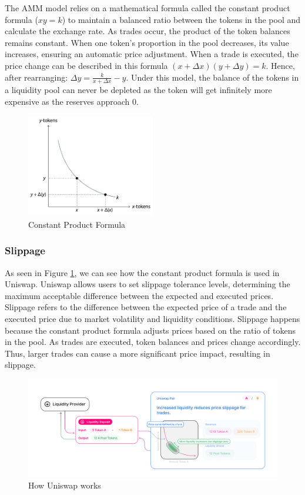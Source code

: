The AMM model relies on a mathematical formula called the constant product formula ($xy = k$) to maintain a balanced ratio between the tokens in the pool and calculate the exchange rate. As trades occur, the product of the token balances remains constant. When one token's proportion in the pool decreases, its value increases, ensuring an automatic price adjustment. When a trade is executed, the price change can be described in this formula $(x + \Delta x)(y + \Delta y) = k$. Hence, after rearranging: $\Delta y = \frac{k}{x + \Delta x} - y$. Under this model, the balance of the tokens in a liquidity pool can never be depleted as the token will get infinitely more expensive as the reserves approach 0.

\begin{figure}[!htb]
    \centering
    \includegraphics[width=0.5\textwidth]{background/Images/constant_product_formula.png}
    \caption{Constant Product Formula~\cite{schar2021decentralized}}
\end{figure}

\subsubsection{Slippage}

As seen in Figure \ref{fig:uniswap_lp}, we can see how the constant product formula is used in Uniswap. Uniswap allows users to set slippage tolerance levels, determining the maximum acceptable difference between the expected and executed prices. Slippage refers to the difference between the expected price of a trade and the executed price due to market volatility and liquidity conditions. Slippage happens because the constant product formula adjusts prices based on the ratio of tokens in the pool. As trades are executed, token balances and prices change accordingly. Thus, larger trades can cause a more significant price impact, resulting in slippage.

\begin{figure}[!htb]
    \centering
    \includegraphics[width=\textwidth]{background/Images/uniswap_lp.jpeg}
    \caption{How Uniswap works~\cite{uniswap} \label{fig:uniswap_lp}}
\end{figure}

